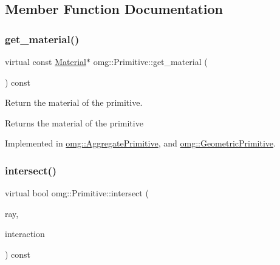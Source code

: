 \subsection{Member Function Documentation}
\mbox{\label{classomg_1_1_primitive_ad9cb98c6f74581d53cadf800fc506333}} 
\subsubsection{\texorpdfstring{get\_material()}{get\_material()}}
{\footnotesize\ttfamily virtual const \mbox{\hyperlink{classomg_1_1_material}{Material}}$\ast$ omg\+::\+Primitive\+::get\+\_\+material (\begin{DoxyParamCaption}{ }\end{DoxyParamCaption}) const\hspace{0.3cm}{\ttfamily [pure virtual]}}



Return the material of the primitive. 

\begin{DoxyReturn}{Returns}
the material of the primitive 
\end{DoxyReturn}


Implemented in \mbox{\hyperlink{classomg_1_1_aggregate_primitive_a339e9fe3ab8e2c0c68c888345b834c21}{omg\+::\+Aggregate\+Primitive}}, and \mbox{\hyperlink{classomg_1_1_geometric_primitive_ae7b7b9ed0a5fc336a3111ef16a09f27a}{omg\+::\+Geometric\+Primitive}}.

\mbox{\label{classomg_1_1_primitive_a51f78d3f52794ae02e18688dff75414c}} 
\subsubsection{\texorpdfstring{intersect()}{intersect()}\hspace{0.1cm}{\footnotesize\ttfamily [1/2]}}
{\footnotesize\ttfamily virtual bool omg\+::\+Primitive\+::intersect (\begin{DoxyParamCaption}\item[{const \mbox{\hyperlink{classomg_1_1_ray}{Ray}} \&}]{ray,  }\item[{\mbox{\hyperlink{classomg_1_1_surface_interaction}{Surface\+Interaction}} $\ast$}]{interaction }\end{DoxyParamCaption}) const\hspace{0.3cm}{\ttfamily [pure virtual]}}



